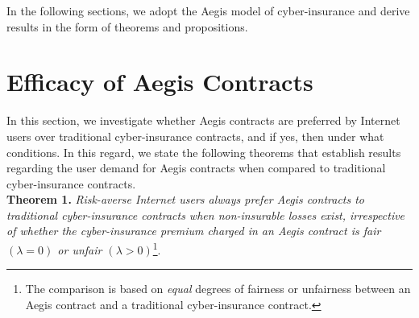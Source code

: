 \documentclass[letterpaper,12pt, onecolumn, nodraft]{IEEEtran}
\begin{document}
In the following sections, we adopt the Aegis model of cyber-insurance and derive results in the form of theorems and propositions.  
\section{ Efficacy of Aegis Contracts} \label{sec-efficacy}
In this section, we investigate whether Aegis contracts are preferred by Internet users over traditional cyber-insurance contracts, and if yes, then under what conditions. In this regard, we state the following theorems that establish results regarding the user demand for Aegis contracts when compared to traditional cyber-insurance contracts.\\
\textbf{Theorem 1.} \emph{Risk-averse Internet users always prefer Aegis contracts to traditional cyber-insurance contracts when non-insurable losses exist, irrespective of whether the cyber-insurance premium charged in an Aegis contract is fair $(\lambda = 0)$ or unfair $(\lambda > 0)$}\footnote{The comparison is based on \emph{equal} degrees of fairness or unfairness between an Aegis contract and a traditional cyber-insurance contract.}.\\
\end{document}
